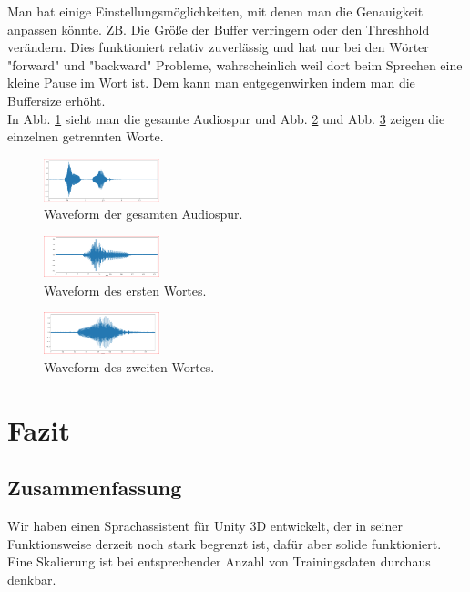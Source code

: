 \documentclass[sigconf]{acmart}
\begin{document}
Man hat einige Einstellungsmöglichkeiten, mit denen man die Genauigkeit anpassen könnte. ZB. Die Größe der Buffer verringern oder den Threshhold verändern.
Dies funktioniert relativ zuverlässig und hat nur bei den Wörter "forward" und "backward" Probleme, wahrscheinlich weil dort beim Sprechen eine kleine Pause im Wort ist. Dem kann man entgegenwirken indem man die Buffersize erhöht. \\
In Abb. \ref{fig:Audio} sieht man die gesamte Audiospur und Abb. \ref{fig:Audio1} und Abb. \ref{fig:Audio2} zeigen die einzelnen getrennten Worte.
\begin{figure}[H]
  \includegraphics[width=0.3\textwidth]{images/Audio1}
  \caption{Waveform der gesamten Audiospur.}
  \Description{}
  \label{fig:Audio}
\end{figure} 
\begin{figure}[H]
  \includegraphics[width=0.3\textwidth]{images/Audio2}
  \caption{Waveform des ersten Wortes.}
  \Description{}
  \label{fig:Audio1}
\end{figure} 
\begin{figure}[H]
  \includegraphics[width=0.3\textwidth]{images/Audio3}
  \caption{Waveform des zweiten Wortes.}
  \Description{}
  \label{fig:Audio2}
\end{figure} 
\section{Fazit}

\subsection{Zusammenfassung}
Wir haben einen Sprachassistent für Unity 3D entwickelt, der in seiner Funktionsweise derzeit noch stark begrenzt ist, dafür aber solide funktioniert. Eine Skalierung ist bei entsprechender Anzahl von Trainingsdaten durchaus denkbar. 
\end{document}
